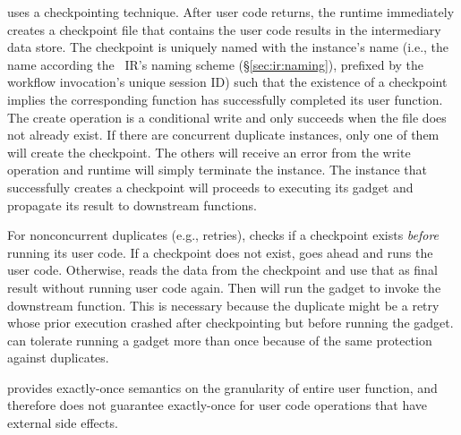 \name{} uses a checkpointing technique. After user code returns, the \name{}
runtime immediately creates a checkpoint file that contains the user code
results in the intermediary data store. The checkpoint is uniquely named with
the instance's name (i.e., the name according the
\name{}~IR's naming scheme (\S\ref{sec:ir:naming}), prefixed by the workflow
invocation's unique session ID) such that the existence of a checkpoint
implies the corresponding function has successfully completed its user
function. The create operation is a conditional write and only succeeds when
the file does not already exist. If there are concurrent duplicate instances,
only one of them will create the checkpoint. The others will receive an error
from the write operation and \name{} runtime will simply terminate the
instance. The instance that successfully creates a checkpoint will proceeds to
executing its gadget and propagate its result to downstream functions.


For nonconcurrent duplicates (e.g., retries), \name{} checks if a checkpoint
exists \emph{before} running its user code. If a checkpoint does not exist,
\name{} goes ahead and runs the user code. Otherwise, \name{} reads the data
from the checkpoint and use that as final result without running user code
again. Then \name{} will run the gadget to invoke the downstream function.
This is necessary because the duplicate might be a retry whose prior execution
crashed after checkpointing but before running the gadget. \name{} can
tolerate running a gadget more than once because of the same protection
against duplicates.

\name{} provides exactly-once semantics on the granularity of entire user
function, and therefore does not guarantee exactly-once for user code
operations that have external side effects.
